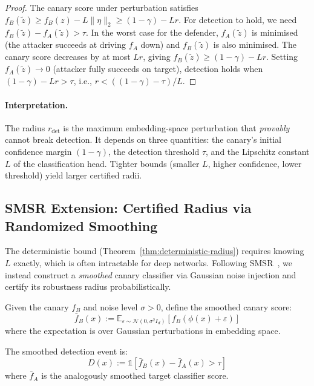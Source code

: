 \begin{proof}
The canary score under perturbation satisfies $f_B(\tilde{z}) \geq f_B(z) - L\|\eta\|_2 \geq (1-\gamma) - Lr$. For detection to hold, we need $f_B(\tilde{z}) - f_A(\tilde{z}) > \tau$. In the worst case for the defender, $f_A(\tilde{z})$ is minimised (the attacker succeeds at driving $f_A$ down) and $f_B(\tilde{z})$ is also minimised. The canary score decreases by at most $Lr$, giving $f_B(\tilde{z}) \geq (1-\gamma) - Lr$. Setting $f_A(\tilde{z}) \to 0$ (attacker fully succeeds on target), detection holds when $(1-\gamma) - Lr > \tau$, i.e., $r < ((1-\gamma) - \tau)/L$.
\end{proof}

\paragraph{Interpretation.} The radius $r_{\text{det}}$ is the maximum embedding-space perturbation that \emph{provably} cannot break detection. It depends on three quantities: the canary's initial confidence margin $(1-\gamma)$, the detection threshold $\tau$, and the Lipschitz constant $L$ of the classification head. Tighter bounds (smaller $L$, higher confidence, lower threshold) yield larger certified radii.

\subsection{SMSR Extension: Certified Radius via Randomized Smoothing}

The deterministic bound (Theorem~\ref{thm:deterministic-radius}) requires knowing $L$ exactly, which is often intractable for deep networks. Following SMSR~\citep{cohen2019certified}, we instead construct a \emph{smoothed} canary classifier via Gaussian noise injection and certify its robustness radius probabilistically.

\begin{definition}
\label{def:smoothed}
Given the canary $f_B$ and noise level $\sigma > 0$, define the smoothed canary score:
\[
\bar{f}_B(x) := \mathbb{E}_{\varepsilon \sim \mathcal{N}(0, \sigma^2 I_d)}[f_B(\phi(x) + \varepsilon)]
\]
where the expectation is over Gaussian perturbations in embedding space.
\end{definition}

\begin{definition}
\label{def:smoothed-detection}
The smoothed detection event is:
\[
D(x) := \mathbb{1}[\bar{f}_B(x) - \bar{f}_A(x) > \tau]
\]
where $\bar{f}_A$ is the analogously smoothed target classifier score.
\end{definition}

